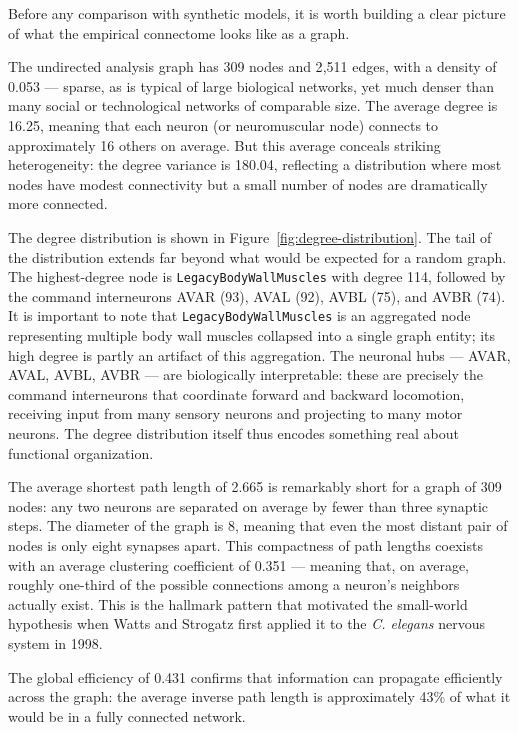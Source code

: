 \documentclass[12pt,a4paper]{report}
\begin{document}
Before any comparison with synthetic models, it is worth building a clear picture of what the empirical connectome looks like as a graph.

The undirected analysis graph has 309 nodes and 2{,}511 edges, with a density of 0.053 — sparse, as is typical of large biological networks, yet much denser than many social or technological networks of comparable size. The average degree is 16.25, meaning that each neuron (or neuromuscular node) connects to approximately 16 others on average. But this average conceals striking heterogeneity: the degree variance is 180.04, reflecting a distribution where most nodes have modest connectivity but a small number of nodes are dramatically more connected.

The degree distribution is shown in Figure~\ref{fig:degree-distribution}. The tail of the distribution extends far beyond what would be expected for a random graph. The highest-degree node is \texttt{LegacyBodyWallMuscles} with degree 114, followed by the command interneurons AVAR (93), AVAL (92), AVBL (75), and AVBR (74). It is important to note that \texttt{LegacyBodyWallMuscles} is an aggregated node representing multiple body wall muscles collapsed into a single graph entity; its high degree is partly an artifact of this aggregation. The neuronal hubs — AVAR, AVAL, AVBL, AVBR — are biologically interpretable: these are precisely the command interneurons that coordinate forward and backward locomotion, receiving input from many sensory neurons and projecting to many motor neurons. The degree distribution itself thus encodes something real about functional organization.

The average shortest path length of 2.665 is remarkably short for a graph of 309 nodes: any two neurons are separated on average by fewer than three synaptic steps. The diameter of the graph is 8, meaning that even the most distant pair of nodes is only eight synapses apart. This compactness of path lengths coexists with an average clustering coefficient of 0.351 — meaning that, on average, roughly one-third of the possible connections among a neuron's neighbors actually exist. This is the hallmark pattern that motivated the small-world hypothesis when Watts and Strogatz first applied it to the \textit{C. elegans} nervous system in 1998.

The global efficiency of 0.431 confirms that information can propagate efficiently across the graph: the average inverse path length is approximately 43\% of what it would be in a fully connected network.
\end{document}
